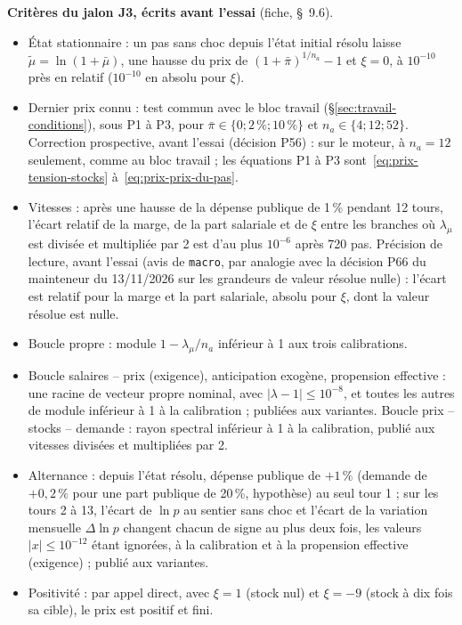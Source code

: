 \documentclass[11pt,a4paper]{article}
\begin{document}
\textbf{Critères du jalon J3, écrits avant l'essai} (fiche, \S~9.6).
\begin{itemize}
\item État stationnaire : un pas sans choc depuis l'état initial résolu laisse $\tilde\mu = \ln(1 + \bar\mu)$, une hausse du prix de $(1 + \bar\pi)^{1/n_a} - 1$ et $\xi = 0$, à $10^{-10}$ près en relatif ($10^{-10}$ en absolu pour $\xi$).
\item Dernier prix connu : test commun avec le bloc travail (\S\ref{sec:travail-conditions}), sous P1 à P3, pour $\bar\pi \in \{0 ; 2\,\% ; 10\,\%\}$ et $n_a \in \{4 ; 12 ; 52\}$. Correction prospective, avant l'essai (décision P56) : sur le moteur, à $n_a = 12$ seulement, comme au bloc travail ; les équations P1 à P3 sont~\eqref{eq:prix-tension-stocks} à~\eqref{eq:prix-prix-du-pas}.
\item Vitesses : après une hausse de la dépense publique de 1\,\% pendant 12 tours, l'écart relatif de la marge, de la part salariale et de $\xi$ entre les branches où $\lambda_\mu$ est divisée et multipliée par 2 est d'au plus $10^{-6}$ après 720 pas. Précision de lecture, avant l'essai (avis de \texttt{macro}, par analogie avec la décision P66 du mainteneur du 13/11/2026 sur les grandeurs de valeur résolue nulle) : l'écart est relatif pour la marge et la part salariale, absolu pour $\xi$, dont la valeur résolue est nulle.
\item Boucle propre : module $1 - \lambda_\mu/n_a$ inférieur à 1 aux trois calibrations.
\item Boucle salaires -- prix (exigence), anticipation exogène, propension effective : une racine de vecteur propre nominal, avec $|\lambda - 1| \le 10^{-8}$, et toutes les autres de module inférieur à 1 à la calibration ; publiées aux variantes. Boucle prix -- stocks -- demande : rayon spectral inférieur à 1 à la calibration, publié aux vitesses divisées et multipliées par 2.
\item Alternance : depuis l'état résolu, dépense publique de $+1\,\%$ (demande de $+0{,}2\,\%$ pour une part publique de 20\,\%, hypothèse) au seul tour 1 ; sur les tours 2 à 13, l'écart de $\ln p$ au sentier sans choc et l'écart de la variation mensuelle $\Delta\ln p$ changent chacun de signe au plus deux fois, les valeurs $|x| \le 10^{-12}$ étant ignorées, à la calibration et à la propension effective (exigence) ; publié aux variantes.
\item Positivité : par appel direct, avec $\xi = 1$ (stock nul) et $\xi = -9$ (stock à dix fois sa cible), le prix est positif et fini.

\end{itemize}
\end{document}
